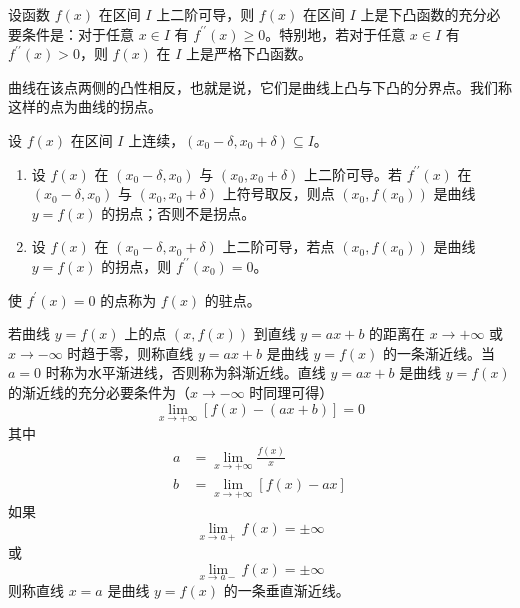 \documentclass{ctexbook}
\begin{document}
\begin{theorem}[二阶导数与凸性的关系]
    设函数 $f(x)$ 在区间 $I$ 上二阶可导，则 $f(x)$ 在区间 $I$ 上是下凸函数的充分必要条件是：对于任意 $x\in I$ 有 $f^{\prime\prime}(x)\geq 0$。特别地，若对于任意 $x\in I$ 有 $f^{\prime\prime}(x)>0$，则 $f(x)$ 在 $I$ 上是严格下凸函数。
\end{theorem}

\begin{definition}[拐点]
    曲线在该点两侧的凸性相反，也就是说，它们是曲线上凸与下凸的分界点。我们称这样的点为曲线的拐点。
\end{definition}

\begin{theorem}[拐点的判定与性质]
    设 $f(x)$ 在区间 $I$ 上连续，$(x_0-\delta,x_0+\delta)\subseteq I$。
    \begin{enumerate}
        \item 设 $f(x)$ 在 $(x_0-\delta,x_0)$ 与 $(x_0,x_0+\delta)$ 上二阶可导。若 $f^{\prime\prime}(x)$ 在 $(x_0-\delta, x_0)$ 与 $(x_0,x_0+\delta)$ 上符号取反，则点 $(x_0,f(x_0))$ 是曲线 $y=f(x)$ 的拐点；否则不是拐点。
        \item 设 $f(x)$ 在 $(x_0-\delta,x_0+\delta)$ 上二阶可导，若点 $(x_0,f(x_0))$ 是曲线 $y=f(x)$ 的拐点，则 $f^{\prime\prime}(x_0)=0$。
    \end{enumerate}
\end{theorem}

\begin{definition}[驻点]
    使 $f^\prime (x)=0$ 的点称为 $f(x)$ 的驻点。
\end{definition}

\begin{definition}[渐近线]
    若曲线 $y=f(x)$ 上的点 $(x,f(x))$ 到直线 $y=ax+b$ 的距离在 $x\rightarrow +\infty$ 或 $x\rightarrow -\infty$ 时趋于零，则称直线 $y=ax+b$ 是曲线 $y=f(x)$ 的一条渐近线。当 $a=0$ 时称为水平渐进线，否则称为斜渐近线。直线 $y=ax+b$ 是曲线 $y=f(x)$ 的渐近线的充分必要条件为（$x\rightarrow -\infty$ 时同理可得）
    \begin{equation}
        \lim_{x\rightarrow +\infty}[f(x)-(ax+b)]=0
    \end{equation}
    其中
    \begin{align}
        a&=\lim_{x\rightarrow +\infty}\frac{f(x)}{x}\\
        b&=\lim_{x\rightarrow +\infty}[f(x)-ax]
    \end{align}
    如果
    \begin{equation}
        \lim_{x\rightarrow a+}f(x)=\pm \infty
    \end{equation}
    或
    \begin{equation}
        \lim_{x\rightarrow a-}f(x)=\pm \infty
    \end{equation}
    则称直线 $x=a$ 是曲线 $y=f(x)$ 的一条垂直渐近线。
\end{definition}
\end{document}
